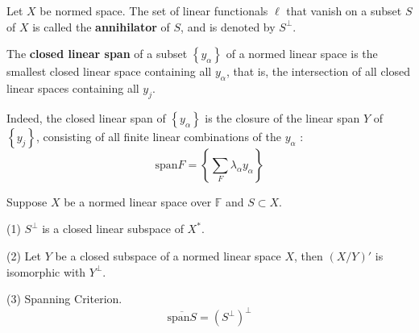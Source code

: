 \documentclass[12pt, oneside]{book}
\begin{document}
\begin{definition}
    Let $X$ be normed space. The set of linear functionals $\ell$ that vanish on a subset $S$ of $X$ is called the \textbf{annihilator} of $S$, and is denoted by $S^{\perp}$.
\end{definition}
\begin{definition}
    The \textbf{closed linear span} of a subset $\left\{y_\alpha\right\}$ of a normed linear space is the smallest closed linear space containing all $y_\alpha$, that is, the intersection of all closed linear spaces containing all $y_j$.

    Indeed, the closed linear span of $\left\{y_\alpha\right\}$ is the closure of the linear span $Y$ of $\left\{y_j\right\}$, consisting of all finite linear combinations of the $y_\alpha$ :
    \begin{equation*}
        \mathrm{span}F
        =
        \left\{\sum_F \lambda_\alpha y_\alpha\right\}
    \end{equation*}
\end{definition}
\begin{proposition}
    Suppose $X$ be a normed linear space over $\mathbb{F}$ and $S \subset X$.

    (1) $S^{\perp}$ is a closed linear subspace of $X^{*}$.

    (2) Let $Y$ be a closed subspace of a normed linear space $X$, then $(X / Y)'$ is isomorphic with $Y^{\perp}$.

    (3) Spanning Criterion.
    \begin{equation*}
        \overline{\mathrm{span} S}
        =
        (S^\bot)^\bot
    \end{equation*}
\end{proposition}
\end{document}
